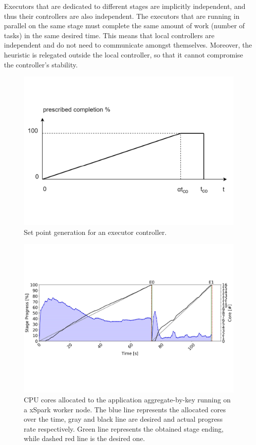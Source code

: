 Executors that are dedicated to different stages are implicitly independent,
and thus their controllers are also independent. The executors
that are running in parallel on the same stage must complete the
same amount of work (number of tasks) in the same desired time.
This means that local controllers are independent and do not need
to communicate amongst themselves. Moreover, the heuristic is relegated
outside the local controller, so that it cannot compromise the controller’s stability.
\begin{figure}
	\centering
	\includegraphics[width=\columnwidth]{Images/exec_controller_set_point.pdf}  
	\caption[Set point generation for an executor controller.]{Set point generation for an executor controller.}
	\label{fig:execControllerSetPoint}
\end{figure}
\begin{figure}
	\centering
	\includegraphics[width=\columnwidth]{Images/xspark_chart_agg_by_key.pdf}  
	\caption[xSpark chart aggrregate-by-key.]{CPU cores allocated to the application aggregate-by-key running on a xSpark worker node. The blue line represents the allocated cores over the time, gray and black line are desired and actual progress rate respectively. Green line represents the obtained stage ending, while dashed red line is the desired one.}
	\label{fig:xsparkChartAggByKey}
\end{figure}
